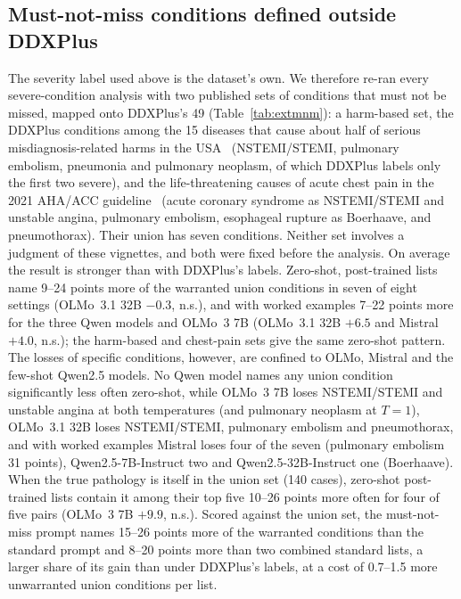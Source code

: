 \documentclass[11pt]{article}
\begin{document}
\subsection{Must-not-miss conditions defined outside DDXPlus}\label{sec:extmnm}
The severity label used above is the dataset's own. We therefore re-ran every severe-condition analysis with two published sets of conditions that must not be missed, mapped onto DDXPlus's 49 (Table~\ref{tab:extmnm}): a harm-based set, the DDXPlus conditions among the 15 diseases that cause about half of serious misdiagnosis-related harms in the USA~\citep{newmantoker2024burden} (NSTEMI/STEMI, pulmonary embolism, pneumonia and pulmonary neoplasm, of which DDXPlus labels only the first two severe), and the life-threatening causes of acute chest pain in the 2021 AHA/ACC guideline~\citep{gulati2021chestpain} (acute coronary syndrome as NSTEMI/STEMI and unstable angina, pulmonary embolism, esophageal rupture as Boerhaave, and pneumothorax). Their union has seven conditions. Neither set involves a judgment of these vignettes, and both were fixed before the analysis.
On average the result is stronger than with DDXPlus's labels. Zero-shot, post-trained lists name 9--24 points more of the warranted union conditions in seven of eight settings (OLMo~3.1 32B $-0.3$, n.s.), and with worked examples 7--22 points more for the three Qwen models and OLMo~3 7B (OLMo~3.1 32B $+6.5$ and Mistral $+4.0$, n.s.); the harm-based and chest-pain sets give the same zero-shot pattern. The losses of specific conditions, however, are confined to OLMo, Mistral and the few-shot Qwen2.5 models. No Qwen model names any union condition significantly less often zero-shot, while OLMo~3 7B loses NSTEMI/STEMI and unstable angina at both temperatures (and pulmonary neoplasm at $T{=}1$), OLMo~3.1 32B loses NSTEMI/STEMI, pulmonary embolism and pneumothorax, and with worked examples Mistral loses four of the seven (pulmonary embolism 31 points), Qwen2.5-7B-Instruct two and Qwen2.5-32B-Instruct one (Boerhaave). When the true pathology is itself in the union set (140 cases), zero-shot post-trained lists contain it among their top five 10--26 points more often for four of five pairs (OLMo~3 7B $+9.9$, n.s.). Scored against the union set, the must-not-miss prompt names 15--26 points more of the warranted conditions than the standard prompt and 8--20 points more than two combined standard lists, a larger share of its gain than under DDXPlus's labels, at a cost of 0.7--1.5 more unwarranted union conditions per list.
\end{document}
